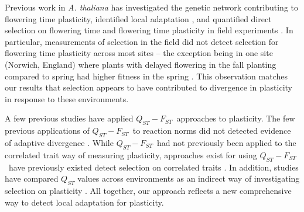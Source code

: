 \documentclass[11pt,letterpaper]{article}
\newcommand{\qf}{$Q_{ST}-F_{ST}$}
\begin{document}
Previous work in \textit{A. thaliana} has investigated the genetic network contributing to flowering time plasticity\citep{wilczek2009effects}, identified local adaptation \citep{fournier2011map, aagren2013genetic}, and quantified direct selection on flowering time \citep{exposito2018spatio, aagren2017adaptive} and flowering time plasticity in field experiments \citep{fournier2022adaptive}.
In particular, measurements of selection in the field did not detect selection for flowering time plasticity across most sites -- the exception being in one site (Norwich, England) where plants with delayed flowering in the fall planting compared to spring had higher fitness in the spring \citep{fournier2022adaptive}.
This observation matches our results that selection appears to have contributed to divergence in plasticity in response to these environments.

A few previous studies have applied \qf\ approaches to plasticity.
The few previous applications of \qf\ to reaction norms did not detected evidence of adaptive divergence \citep{von2008partitioning,de2016evolution,lind2011gene}.
While \qf\ had not previously been applied to the correlated trait way of measuring plasticity, approaches exist for using \qf\ have previously existed detect selection on correlated traits \citep{chenoweth2008q, kremer1997multilocus}.
In addition, studies have compared $Q_{ST}$ values across environments as an indirect way of investigating selection on plasticity \citep{ramirez2018natural, rodriguez2016capturing, hangartner2012adaptive, palo2003latitudinal}. 
All together, our approach reflects a new comprehensive way to detect local adaptation for plasticity.


\end{document}
